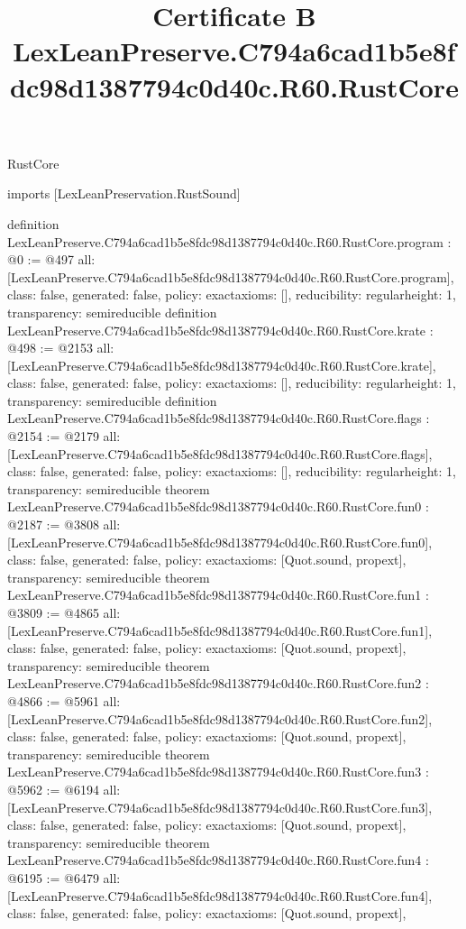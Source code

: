 \begin{lexlean}{RustCore}
\title{Certificate B LexLeanPreserve.C794a6cad1b5e8fdc98d1387794c0d40c.R60.RustCore}
\begin{coremodule}
imports [LexLeanPreservation.RustSound]

definition LexLeanPreserve.C794a6cad1b5e8fdc98d1387794c0d40c.R60.RustCore.program : @0 := @497 {
  all: [LexLeanPreserve.C794a6cad1b5e8fdc98d1387794c0d40c.R60.RustCore.program],
  class: false,
  generated: false,
  policy: exact{axioms: []},
  reducibility: regular{height: 1},
  transparency: semireducible
}
definition LexLeanPreserve.C794a6cad1b5e8fdc98d1387794c0d40c.R60.RustCore.krate : @498 := @2153 {
  all: [LexLeanPreserve.C794a6cad1b5e8fdc98d1387794c0d40c.R60.RustCore.krate],
  class: false,
  generated: false,
  policy: exact{axioms: []},
  reducibility: regular{height: 1},
  transparency: semireducible
}
definition LexLeanPreserve.C794a6cad1b5e8fdc98d1387794c0d40c.R60.RustCore.flags : @2154 := @2179 {
  all: [LexLeanPreserve.C794a6cad1b5e8fdc98d1387794c0d40c.R60.RustCore.flags],
  class: false,
  generated: false,
  policy: exact{axioms: []},
  reducibility: regular{height: 1},
  transparency: semireducible
}
theorem LexLeanPreserve.C794a6cad1b5e8fdc98d1387794c0d40c.R60.RustCore.fun0 : @2187 := @3808 {
  all: [LexLeanPreserve.C794a6cad1b5e8fdc98d1387794c0d40c.R60.RustCore.fun0],
  class: false,
  generated: false,
  policy: exact{axioms: [Quot.sound, propext]},
  transparency: semireducible
}
theorem LexLeanPreserve.C794a6cad1b5e8fdc98d1387794c0d40c.R60.RustCore.fun1 : @3809 := @4865 {
  all: [LexLeanPreserve.C794a6cad1b5e8fdc98d1387794c0d40c.R60.RustCore.fun1],
  class: false,
  generated: false,
  policy: exact{axioms: [Quot.sound, propext]},
  transparency: semireducible
}
theorem LexLeanPreserve.C794a6cad1b5e8fdc98d1387794c0d40c.R60.RustCore.fun2 : @4866 := @5961 {
  all: [LexLeanPreserve.C794a6cad1b5e8fdc98d1387794c0d40c.R60.RustCore.fun2],
  class: false,
  generated: false,
  policy: exact{axioms: [Quot.sound, propext]},
  transparency: semireducible
}
theorem LexLeanPreserve.C794a6cad1b5e8fdc98d1387794c0d40c.R60.RustCore.fun3 : @5962 := @6194 {
  all: [LexLeanPreserve.C794a6cad1b5e8fdc98d1387794c0d40c.R60.RustCore.fun3],
  class: false,
  generated: false,
  policy: exact{axioms: [Quot.sound, propext]},
  transparency: semireducible
}
theorem LexLeanPreserve.C794a6cad1b5e8fdc98d1387794c0d40c.R60.RustCore.fun4 : @6195 := @6479 {
  all: [LexLeanPreserve.C794a6cad1b5e8fdc98d1387794c0d40c.R60.RustCore.fun4],
  class: false,
  generated: false,
  policy: exact{axioms: [Quot.sound, propext]},
}
\end{coremodule}
\end{lexlean}
